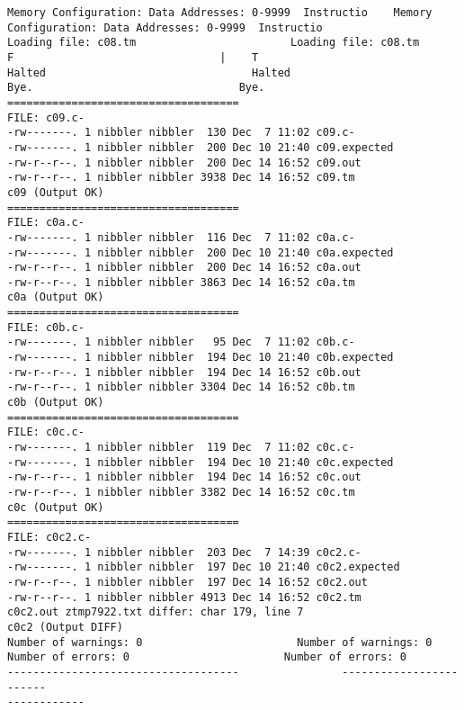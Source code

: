 \documentclass[12pt]{book}
\begin{document}
\begin{lstlisting}
Memory Configuration: Data Addresses: 0-9999  Instructio    Memory 
Configuration: Data Addresses: 0-9999  Instructio
Loading file: c08.tm                        Loading file: c08.tm
F                                |    T 
Halted                                Halted
Bye.                                Bye.
====================================
FILE: c09.c-
-rw-------. 1 nibbler nibbler  130 Dec  7 11:02 c09.c-
-rw-------. 1 nibbler nibbler  200 Dec 10 21:40 c09.expected
-rw-r--r--. 1 nibbler nibbler  200 Dec 14 16:52 c09.out
-rw-r--r--. 1 nibbler nibbler 3938 Dec 14 16:52 c09.tm
c09 (Output OK)
====================================
FILE: c0a.c-
-rw-------. 1 nibbler nibbler  116 Dec  7 11:02 c0a.c-
-rw-------. 1 nibbler nibbler  200 Dec 10 21:40 c0a.expected
-rw-r--r--. 1 nibbler nibbler  200 Dec 14 16:52 c0a.out
-rw-r--r--. 1 nibbler nibbler 3863 Dec 14 16:52 c0a.tm
c0a (Output OK)
====================================
FILE: c0b.c-
-rw-------. 1 nibbler nibbler   95 Dec  7 11:02 c0b.c-
-rw-------. 1 nibbler nibbler  194 Dec 10 21:40 c0b.expected
-rw-r--r--. 1 nibbler nibbler  194 Dec 14 16:52 c0b.out
-rw-r--r--. 1 nibbler nibbler 3304 Dec 14 16:52 c0b.tm
c0b (Output OK)
====================================
FILE: c0c.c-
-rw-------. 1 nibbler nibbler  119 Dec  7 11:02 c0c.c-
-rw-------. 1 nibbler nibbler  194 Dec 10 21:40 c0c.expected
-rw-r--r--. 1 nibbler nibbler  194 Dec 14 16:52 c0c.out
-rw-r--r--. 1 nibbler nibbler 3382 Dec 14 16:52 c0c.tm
c0c (Output OK)
====================================
FILE: c0c2.c-
-rw-------. 1 nibbler nibbler  203 Dec  7 14:39 c0c2.c-
-rw-------. 1 nibbler nibbler  197 Dec 10 21:40 c0c2.expected
-rw-r--r--. 1 nibbler nibbler  197 Dec 14 16:52 c0c2.out
-rw-r--r--. 1 nibbler nibbler 4913 Dec 14 16:52 c0c2.tm
c0c2.out ztmp7922.txt differ: char 179, line 7
c0c2 (Output DIFF)
Number of warnings: 0                        Number of warnings: 0
Number of errors: 0                        Number of errors: 0
------------------------------------                ------------------------
------------


\end{lstlisting}
\end{document}
